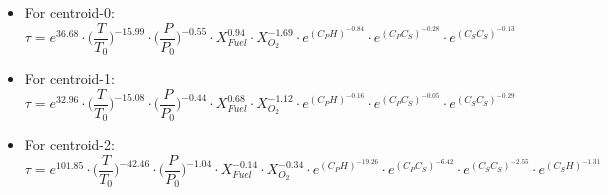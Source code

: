 \documentclass[preprint,12pt]{elsarticle}
\begin{document}
				   \begin{itemize}
						\item For centroid-0:							
						\begin{equation}\label{eq:c0}
					\tau = e^{36.68}\cdot 
					\bigg(\frac{T}{T_0}\bigg)^{-15.99}	\cdot
					\bigg(\frac{P}{P_0}\bigg)^{-0.55} \cdot
					X_{Fuel}^{0.94} \cdot
					X_{O_2}^{-1.69} \cdot
					e^{(C_PH)^{-0.84}} \cdot	
					e^{(C_PC_S)^{-0.28}} \cdot		
					e^{(C_SC_S)^{-0.13}} 					
						\end{equation}

						\item For centroid-1:							
						\begin{equation}\label{eq:c1}
						\tau = e^{32.96}\cdot 
						\bigg(\frac{T}{T_0}\bigg)^{-15.08}	\cdot
						\bigg(\frac{P}{P_0}\bigg)^{-0.44} \cdot
						X_{Fuel}^{0.68} \cdot
						X_{O_2}^{-1.12} \cdot
						e^{(C_PH)^{-0.16}} \cdot	
						e^{(C_PC_S)^{-0.05}} \cdot		
						e^{(C_SC_S)^{-0.29}} 					
						\end{equation}
						
						\item For centroid-2:							
						\begin{equation}\label{eq:c2}
						\tau = e^{101.85}\cdot 
						\bigg(\frac{T}{T_0}\bigg)^{-42.46}	\cdot
						\bigg(\frac{P}{P_0}\bigg)^{-1.04} \cdot
						X_{Fuel}^{-0.14} \cdot
						X_{O_2}^{-0.34} \cdot
						e^{(C_PH)^{-19.26}} \cdot	
						e^{(C_PC_S)^{-6.42}} \cdot		
						e^{(C_SC_S)^{-2.55}} \cdot
						e^{(C_SH)^{-1.31}}					
						\end{equation}
				   \end{itemize}
				   
\end{document}
